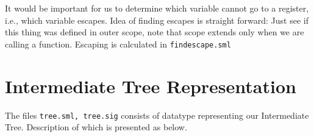 It would be important for us to determine which variable cannot go to a register, i.e., which variable escapes. Idea of finding escapes is straight forward: Just see if this thing was defined in outer scope, note that scope extends only when we are calling a function. Escaping is calculated in \texttt{findescape.sml}

\section{Intermediate Tree Representation}


The files \texttt{tree.sml, tree.sig} consists of datatype representing our Intermediate Tree. Description of which is presented as below.

